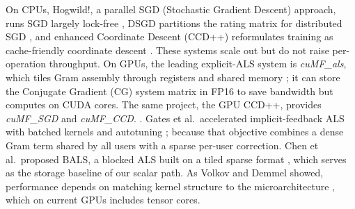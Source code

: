 On CPUs, Hogwild!, a parallel SGD (Stochastic Gradient Descent) approach, runs SGD largely lock-free \cite{recht2011hogwild}, DSGD partitions the rating matrix for distributed SGD \cite{gemulla2011large}, and enhanced Coordinate Descent (CCD++) reformulates training as cache-friendly coordinate descent \cite{yu2012scalable}. These systems scale out but do not raise per-operation throughput. On GPUs, the leading explicit-ALS system is \textit{cuMF\_als}, which tiles Gram assembly through registers and shared memory \cite{tan2016faster}; it can store the Conjugate Gradient (CG)  system matrix in FP16 to save bandwidth but computes on CUDA cores. The same project, the GPU CCD++,  provides \textit{cuMF\_SGD} \cite{xie2017cumf} and \textit{cuMF\_CCD}. \cite{nisa2017parallel}. Gates et al.\ accelerated implicit-feedback ALS with batched kernels and autotuning \cite{gates2015accelerating}; because that objective combines a dense Gram term shared by all users with a sparse per-user correction. Chen et al.\ proposed BALS, a blocked ALS built on a tiled sparse format \cite{chen2021bals}, which serves as the storage baseline of our scalar path. As Volkov and Demmel showed, performance depends on matching kernel structure to the microarchitecture \cite{volkov2008benchmarking}, which on current GPUs includes tensor cores.

